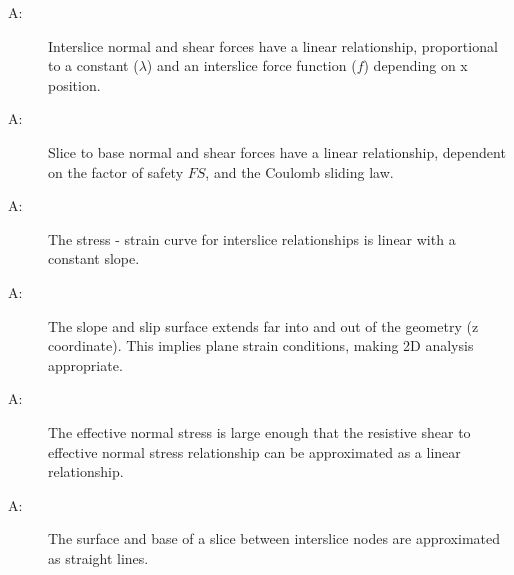 \documentclass[12pt]{article}
\newcounter{assumpnum}
\newcommand{\atheassumpnum}{A\theassumpnum}
\begin{document}
\begin{description}
\item[\atheassumpnum\label{A:Interslice-Norm-Shear-Forces-Linear}:]Interslice normal and shear forces have a linear relationship, proportional to a constant ($λ$) and an interslice force function ($f$) depending on x position.
\end{description}
\begin{description}
\item[\atheassumpnum\label{A:Base-Norm-Shear-Forces-Linear-on-FS}:]Slice to base normal and shear forces have a linear relationship, dependent on the factor of safety $FS$, and the Coulomb sliding law.
\end{description}
\begin{description}
\item[\atheassumpnum\label{A:Stress-Strain-Curve-interslice-Linear}:]The stress - strain curve for interslice relationships is linear with a constant slope.
\end{description}
\begin{description}
\item[\atheassumpnum\label{A:Plane-Strain-Conditions}:]The slope and slip surface extends far into and out of the geometry (z coordinate). This implies plane strain conditions, making 2D analysis appropriate.
\end{description}
\begin{description}
\item[\atheassumpnum\label{A:Effective-Norm-Stress-Large}:]The effective normal stress is large enough that the resistive shear to effective normal stress relationship can be approximated as a linear relationship.
\end{description}
\begin{description}
\item[\atheassumpnum\label{A:Surface-Base-Slice-between-Interslice-Straight-Lines}:]The surface and base of a slice between interslice nodes are approximated as straight lines.
\end{description}
\end{document}
